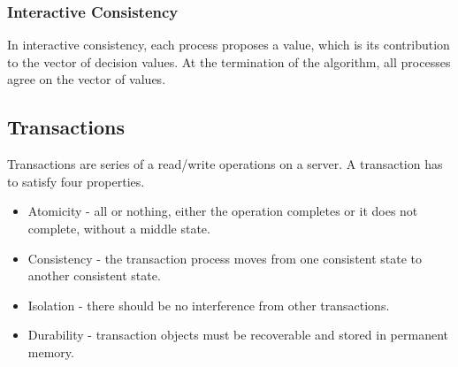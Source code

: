 \documentclass{math}
\begin{document}
\subsubsection*{Interactive Consistency}
In interactive consistency, each process proposes a value, which is its
contribution to the vector of decision values. At the termination of the
algorithm, all processes agree on the vector of values.

\subsection*{Transactions}
Transactions are series of a read/write operations on a server. A transaction
has to satisfy four properties.
\begin{itemize}
  \item Atomicity - all or nothing, either the operation completes or it does
  not complete, without a middle state.
  \item Consistency - the transaction process moves from one consistent state to
  another consistent state.
  \item Isolation - there should be no interference from other transactions.
  \item Durability - transaction objects must be recoverable and stored in
  permanent memory.
\end{itemize}
\end{document}
